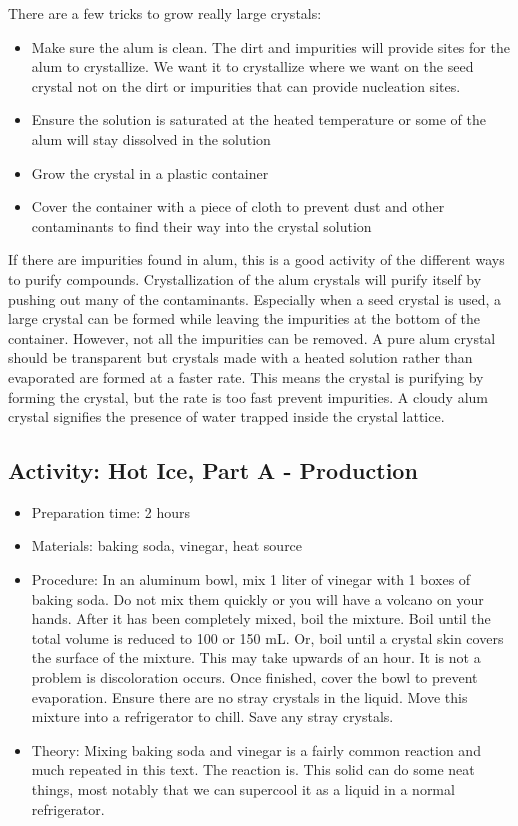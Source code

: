 \begin{itemize}
{\begin{itemize}
\begin{itemize}
{There are a few tricks to grow really large crystals:
\begin{itemize}
\item{Make sure the alum is clean. The dirt and impurities will provide sites for the alum to crystallize. We want it to crystallize where we want on the seed crystal not on the dirt or impurities that can provide nucleation sites.}
\item{Ensure the solution is saturated at the heated temperature or some of the alum will stay dissolved in the solution}
\item{Grow the crystal in a plastic container}
\item{Cover the container with a piece of cloth to prevent dust and other contaminants to find their way into the crystal solution}
\end{itemize}
If there are impurities found in alum, this is a good activity of the different ways to purify compounds. Crystallization of the alum crystals will purify itself by pushing out many of the contaminants. Especially when a seed crystal is used, a large crystal can be formed while leaving the impurities at the bottom of the container. However, not all the impurities can be removed. A pure alum crystal should be transparent but crystals made with a heated solution rather than evaporated are formed at a faster rate. This means the crystal is purifying by forming the crystal, but the rate is too fast prevent impurities. A cloudy alum crystal signifies the presence of water trapped inside the crystal lattice. }
\end{itemize}

\subsection{Activity: Hot Ice, Part A - Production}
\begin{itemize}
\item{Preparation time: 2 hours}
\item{Materials: baking soda, vinegar, heat source}
\item{Procedure: In an aluminum bowl, mix 1 liter of vinegar with 1 boxes of baking soda. Do not mix them quickly or you will have a volcano on your hands. After it has been completely mixed, boil the mixture. Boil until the total volume is reduced to 100 or 150 mL. Or, boil until a crystal skin covers the surface of the mixture. This may take upwards of an hour. It is not a problem is discoloration occurs. Once finished, cover the bowl to prevent evaporation. Ensure there are no stray crystals in the liquid. Move this mixture into a refrigerator to chill. Save any stray crystals.}
\item{Theory: Mixing baking soda and vinegar is a fairly common reaction and much repeated in this text. The reaction is. This solid can do some neat things, most notably that we can supercool it as a liquid in a normal refrigerator.}
\end{itemize}


\end{itemize}}
\end{itemize}
